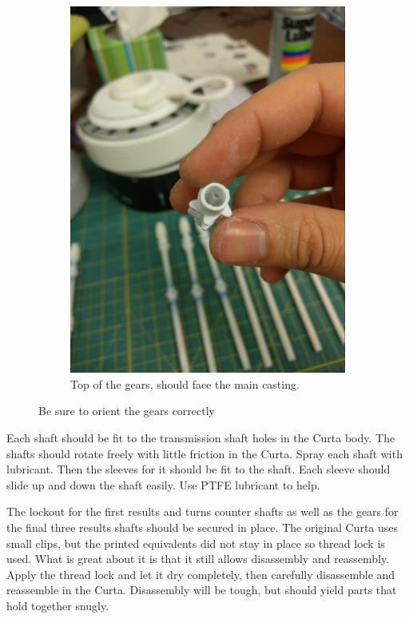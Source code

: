 \documentclass[openany]{book}
\begin{document}
\begin{figure}[!ht]
	\begin{subfigure}{.46\textwidth}
		\centering
		\includegraphics[width=.95\textwidth]{images/image38.jpg}
		\caption{Top of the gears, should face the main casting.}
		\label{fig:image38}	
	\end{subfigure}
 	\caption{Be sure to orient the gears correctly}
 	\label{fig:gearorient}
\end{figure}

Each shaft should be fit to the transmission shaft holes in the Curta body. The shafts should rotate freely with little friction in the Curta. Spray each shaft with lubricant. Then the sleeves for it should be fit to the shaft. Each sleeve should slide up and down the shaft easily. Use PTFE lubricant to help.

The lockout for the first results and turns counter shafts as well as the gears for the final three results shafts should be secured in place. The original Curta uses small clips, but the printed equivalents did not stay in place so thread lock is used. What is great about it is that it still allows disassembly and reassembly. Apply the thread lock and let it dry completely, then carefully disassemble and reassemble in the Curta. Disassembly will be tough, but should yield parts that hold together snugly.
\end{document}
